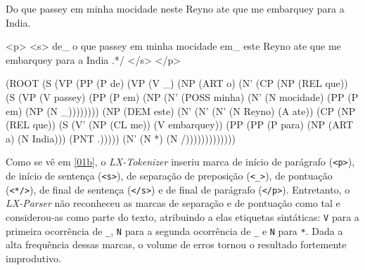 \documentclass[portuguese]{textolivre}
\begin{document}
\begin{description}[topsep=10pt, parsep=2pt, itemindent=!]
\item[(01a)\label{01a}] Do que passey em minha mocidade neste Reyno ate que me embarquey para a India.

\item[(01b)\label{01b}]
<p> <s> de\_ o que passey em minha mocidade em\_ este Reyno ate que me embarquey para a India .*/ </s> </p>

\item[(01c)\label{01c}]
(ROOT (S (VP (PP (P de) (VP (V \_) (NP (ART o) (N' (CP (NP (REL que)) (S (VP (V passey) (PP (P em) (NP (N' (POSS minha) (N' (N mocidade) (PP (P em) (NP (N \_)))))))) (NP (DEM este) (N' (N' (N' (N Reyno) (A ate)) (CP (NP (REL que)) (S (V' (NP (CL me)) (V embarquey)) (PP (PP (P para) (NP (ART a) (N India))) (PNT .))))) (N' (N *) (N /)))))))))))))
\end{description}


Como se vê em \ref{01b}, o \textit{LX-Tokenizer} inseriu marca de início de parágrafo (\lstinline{<p>}), de início de sentença (\lstinline{<s>}), de separação de preposição (\lstinline{<_>}), de pontuação (\lstinline{<*/>}), de final de sentença (\lstinline{</s>}) e de final de parágrafo (\lstinline{</p>}). Entretanto, o \textit{LX-Parser} não reconheceu as marcas de separação e de pontuação como tal e considerou-as como parte do texto, atribuindo a elas etiquetas sintáticas: \lstinline{V} para a primeira ocorrência de \lstinline{_}, \lstinline{N}  para a segunda ocorrência de \lstinline{_} e \lstinline{N} para \lstinline{*}. Dada a alta frequência dessas marcas, o volume de erros tornou o resultado fortemente improdutivo.
\end{document}
